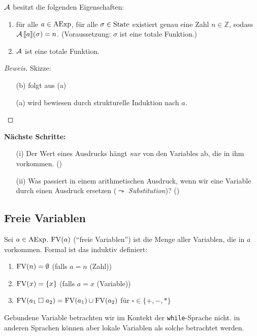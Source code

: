 \begin{theorem}
    $\operatorname{\mathcal{A}}$ besitzt die folgenden Eigenschaften:
    \begin{enumerate}
        \item für alle $a \in \operatorname{AExp}$, für alle $\sigma \in \operatorname{State}$ existiert genau eine Zahl $n \in \mathbb{Z}$, sodass $\operatorname{\mathcal{A}}\mathrm{[}\kern-.14em\mathrm{[} a \mathrm{]}\kern-.14em\mathrm{]} (\sigma) = n$. (Voraussetzung: $\sigma$ ist eine totale Funktion.)
        \item $\operatorname{\mathcal{A}}$ ist eine totale Funktion.
    \end{enumerate}
\end{theorem}

\begin{proof}[Beweis]
    Skizze:
    \begin{enumerate}
        \item[(b)] folgt aus (a)
        \item[(a)] wird bewiesen durch strukturelle Induktion nach $a$.
    \end{enumerate}
\end{proof}

\par\bigskip
\textbf{Nächste Schritte:}
\begin{enumerate}
    \item[(i)] Der Wert eines Ausdrucks hängt \emph{nur} von den Variables ab, die in ihm vorkommen. ()
    \item[(ii)] Was passiert in einem arithmetischen Ausdruck, wenn wir eine Variable durch einen Ausdruck ersetzen ($\leadsto$ \emph{Substitution})? ()
\end{enumerate}



\subsection{Freie Variablen} \label{section:freeVars}

\begin{definition}
    Sei $a \in \operatorname{AExp}$. $\operatorname{FV}(a)$ (``freie Variablen'') ist die Menge aller Variablen, die in $a$ vorkommen. Formal ist das induktiv definiert:
    \begin{enumerate}
        \item $\operatorname{FV}(n) = \emptyset$ \quad\quad\quad (falls $a = n$ (Zahl))
        \item $\operatorname{FV}(x) = \{ x \}$ \quad\quad (falls $a = x$ (Variable))
        \item $\operatorname{FV}(a_1 \;\square\; a_2) = \operatorname{FV}(a_1) \cup \operatorname{FV}(a_2)$ \quad\quad für $\square \in \{ +, -, * \}$
    \end{enumerate}

    Gebundene Variable betrachten wir im Kontekt der \texttt{while}-Sprache nicht. in anderen Sprachen können aber lokale Variablen \zb als solche betrachtet werden.
\end{definition}

